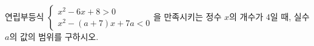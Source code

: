 연립부등식 $\begin{cases} x^2-6x+8>0 \\ x^2-(a+7)x+7a<0 \end{cases}$을 만족시키는 정수 $x$의 개수가 $4$일 때, 실수 $a$의 값의 범위를 구하시오. 
